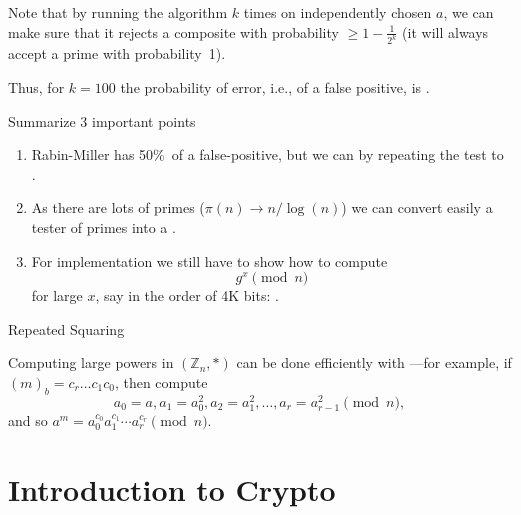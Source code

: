 \begin{frame}
Note that by running the algorithm $k$ times on independently chosen
$a$, we can make sure that it rejects a composite with probability
$\ge 1-\frac{1}{2^k}$ (it will always accept a prime with
probability~1).  

Thus, for $k=100$ the probability of error, i.e., of
a false positive, is .
\end{frame}

\begin{frame}
{Summarize 3 important points}

\begin{enumerate}
\item  Rabin-Miller has 50\%\ of a false-positive, but we can
 by repeating the test to
.

\item  As there are lots of primes ($\pi(n)\rightarrow n/\log(n)$) we
can convert easily a tester of primes into a .

\item  For implementation we still have to show how to compute
$$
g^x\pmod n
$$ 
for large $x$, say in the order of 4K bits:
. 
\end{enumerate}
\end{frame}

\begin{frame}
{Repeated Squaring}

Computing large powers in $(\mathbb{Z}_n,\ast)$ can be done
efficiently with ---for example, if
$(m)_b=c_r\ldots c_1c_0$, then compute
$$
a_0=a,a_1=a_0^2,a_2=a_1^2,\ldots, a_r=a_{r-1}^2\pmod n,
$$
and so $a^{m}=a_0^{c_0}a_1^{c_1}\cdots a_r^{c_r}\pmod n$.
\end{frame}

\section{Introduction to Crypto}

